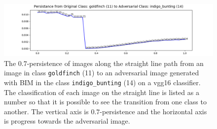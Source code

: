 \begin{figure}[ht]
\centering
\includegraphics[width = \textwidth]
{c3_figures/persistence_interpolation-IMNET-class-11-vgg16-BIM-48-attack_data-001.png}
\caption{The $0.7$-persistence of images along the straight line path from an image in class \texttt{goldfinch} (11) to an adversarial image generated with BIM in the class \texttt{indigo\_bunting} (14) on a vgg16 classifier. The classification of each image on the straight line is listed as a number so that it is possible to see the transition from one class to another. The vertical axis is $0.7$-persistence and the horizontal axis is progress towards the adversarial image.}\label{fig:persistent_interpimage}
\end{figure}

